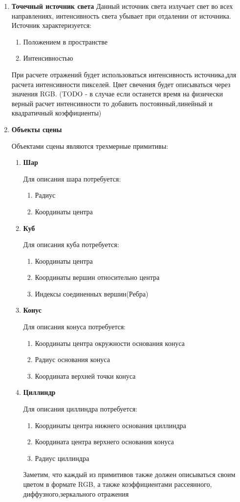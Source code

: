 \documentclass[a4paper,14pt, unknownkeysallowed]{extreport}
\begin{document}
\begin{enumerate}
	\item \textbf{Точечный источник света}
	Данный источник света излучает свет во всех направлениях, интенсивность света убывает при отдалении от источника.
	Источник характеризуется:
	\begin{enumerate}
		\item Положением в пространстве
		\item Интенсивностью
	\end{enumerate}
	При расчете отражений будет использоваться интенсивность источника,для расчета интенсивности пикселей. Цвет свечения будет описываться через значения RGB.
	(TODO - в случае если останется время на физически верный расчет интенсивности то добавить постоянный,линейный и квадратичный коэффициенты)
	\item \textbf{Объекты сцены}
	
	Объектами сцены являются трехмерные примитивы:
	\begin{enumerate}
		\item \textbf{Шар}
		
		Для описания шара потребуется:
		\begin{enumerate}
			\item Радиус
			\item Координаты центра
		\end{enumerate}
		\item  \textbf{Куб}
		
		Для описания куба потребуется:
		\begin{enumerate}
			\item Координаты центра
			\item Координаты вершин относительно центра
			\item Индексы соединенных вершин(Ребра)
		\end{enumerate}
		\item  \textbf{Конус}
		
		Для описания конуса потребуется:
		\begin{enumerate}
			\item Координаты центра окружности основания конуса
			\item Радиус основания конуса
			\item Координата верхней точки конуса
		\end{enumerate}
		\item  \textbf{Циллиндр}
		
		Для описания циллиндра потребуется:
		\begin{enumerate}
			\item Координаты центра нижнего основания циллиндра
			\item Координата центра верхнего основания конуса
			\item Радиус циллиндра
		\end{enumerate}
		Заметим, что каждый из примитивов также должен описываться своим цветом в формате RGB, а также
		коэффициентами рассеянного, диффузного,зеркального отражения
	\end{enumerate}


\end{enumerate}
\end{document}
